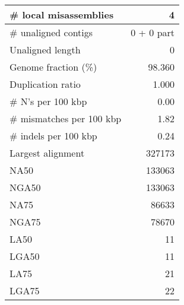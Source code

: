 \documentclass[12pt,a4paper]{article}
\begin{document}
\begin{table}[ht]
\begin{center}
\begin{tabular}{|l*{1}{|r}|}
\# local misassemblies & 4 \\ \hline
\# unaligned contigs & 0 + 0 part \\ \hline
Unaligned length & 0 \\ \hline
Genome fraction (\%) & 98.360 \\ \hline
Duplication ratio & 1.000 \\ \hline
\# N's per 100 kbp & 0.00 \\ \hline
\# mismatches per 100 kbp & 1.82 \\ \hline
\# indels per 100 kbp & 0.24 \\ \hline
Largest alignment & 327173 \\ \hline
NA50 & 133063 \\ \hline
NGA50 & 133063 \\ \hline
NA75 & 86633 \\ \hline
NGA75 & 78670 \\ \hline
LA50 & 11 \\ \hline
LGA50 & 11 \\ \hline
LA75 & 21 \\ \hline
LGA75 & 22 \\ \hline
\end{tabular}
\end{center}
\end{table}
\end{document}
